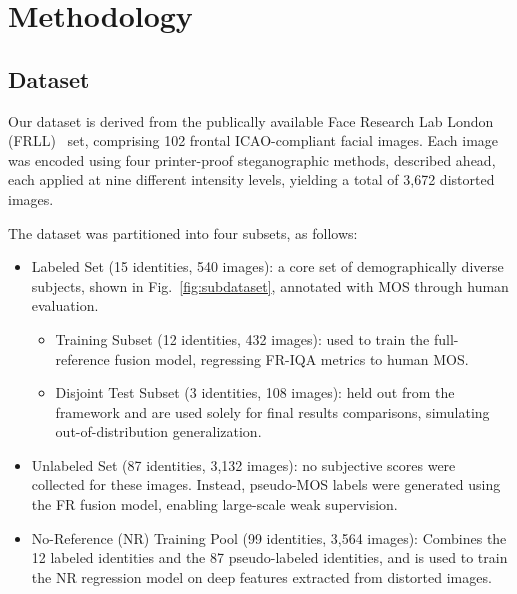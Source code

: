 \section{Methodology}\label{sec:methodology}

\subsection{Dataset}

Our dataset is derived from the publically available Face Research Lab London (FRLL)~\cite{DeBruine2017} set, comprising 102 frontal ICAO-compliant facial images. Each image was encoded using four printer-proof steganographic methods, described ahead, each applied at nine different intensity levels, yielding a total of 3,672 distorted images.

The dataset was partitioned into four subsets, as follows:

\begin{itemize}
    \item Labeled Set (15 identities, 540 images): a core set of demographically diverse subjects, shown in Fig.~\ref{fig:subdataset}, annotated with MOS through human evaluation.
    \begin{itemize}
        \item Training Subset (12 identities, 432 images): used to train the full-reference fusion model, regressing FR-IQA metrics to human MOS.\@
        \item Disjoint Test Subset (3 identities, 108 images): held out from the framework and are used solely for final results comparisons, simulating out-of-distribution generalization.
    \end{itemize}
    \item Unlabeled Set (87 identities, 3,132 images): no subjective scores were collected for these images. Instead, pseudo-MOS labels were generated using the FR fusion model, enabling large-scale weak supervision.
    \item No-Reference (NR) Training Pool (99 identities, 3,564 images): Combines the 12 labeled identities and the 87 pseudo-labeled identities, and is used to train the NR regression model on deep features extracted from distorted images.
\end{itemize}


